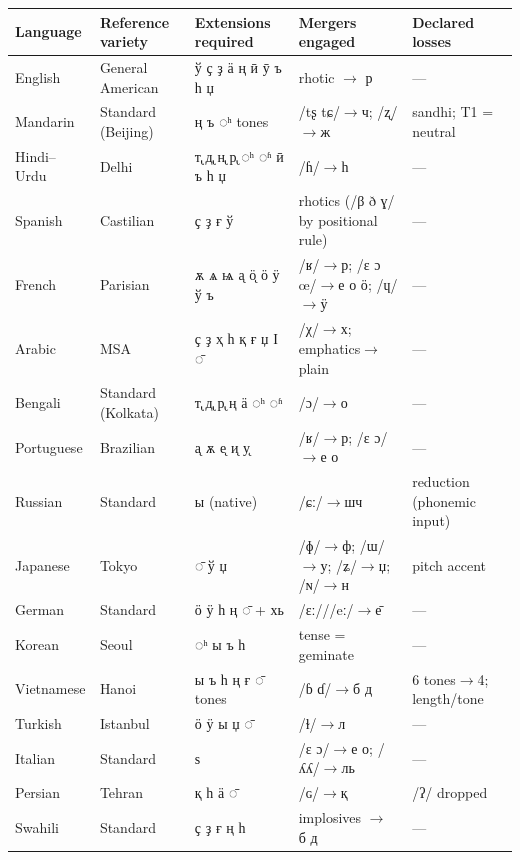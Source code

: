 \documentclass[11pt]{article}
\newcommand{\cz}[1]{{\chu #1}}
\newcommand{\ph}[1]{{\ipafont/#1/}}
\begin{document}
\begin{table}[ht]\centering\footnotesize\setlength{\tabcolsep}{3pt}
\begin{tabular}{lllll}
\toprule
Language & Reference variety & Extensions required & Mergers engaged & Declared losses \\
\midrule
English & General American & \cz{ў ҫ ҙ ӓ ң ӣ ӯ ъ һ џ} & rhotic $\rightarrow$ \cz{р} & — \\
Mandarin & Standard (Beijing) & \cz{ң ъ} \cz{◌ʰ} tones & \ph{tʂ tɕ}$\rightarrow$\cz{ч}; \ph{ʐ}$\rightarrow$\cz{ж} & sandhi; T1 = neutral \\
Hindi--Urdu & Delhi & \cz{т̢ д̢ н̢ р̢} \cz{◌ʰ ◌ʱ} \cz{ӣ ъ һ џ} & \ph{ɦ}$\rightarrow$\cz{һ} & — \\
Spanish & Castilian & \cz{ҫ ҙ ғ ў} & rhotics (\ph{β ð ɣ} by positional rule) & — \\
French & Parisian & \cz{ѫ ѧ ѩ а̨ ӧ̨ ӧ ӱ ў ъ} & \ph{ʁ}$\rightarrow$\cz{р}; \ph{ɛ ɔ œ}$\rightarrow$\cz{е о ӧ}; \ph{ɥ}$\rightarrow$\cz{ӱ} & — \\
Arabic & MSA & \cz{ҫ ҙ ҳ һ қ ғ џ Ӏ ◌̄} & \ph{χ}$\rightarrow$\cz{х}; emphatics$\rightarrow$plain & — \\
Bengali & Standard (Kolkata) & \cz{т̢ д̢ р̢ ң ӓ} \cz{◌ʰ ◌ʱ} & \ph{ɔ}$\rightarrow$\cz{о} & — \\
Portuguese & Brazilian & \cz{а̨ ѫ е̨ и̨ у̨} & \ph{ʁ}$\rightarrow$\cz{р}; \ph{ɛ ɔ}$\rightarrow$\cz{е о} & — \\
Russian & Standard & \cz{ы} (native) & \ph{ɕː}$\rightarrow$\cz{шч} & reduction (phonemic input) \\
Japanese & Tokyo & \cz{◌̄ ў џ} & \ph{ɸ}$\rightarrow$\cz{ф}; \ph{ɯ}$\rightarrow$\cz{у}; \ph{ʑ}$\rightarrow$\cz{џ}; \ph{ɴ}$\rightarrow$\cz{н} & pitch accent \\
German & Standard & \cz{ӧ ӱ һ ң ◌̄} + \cz{хь} & \ph{ɛː}/\ph{eː}$\rightarrow$\cz{е̄} & — \\
Korean & Seoul & \cz{◌ʰ} \cz{ы ъ һ} & tense = geminate & — \\
Vietnamese & Hanoi & \cz{ы ъ һ ң ғ ◌̄} tones & \ph{ɓ ɗ}$\rightarrow$\cz{б д} & 6 tones$\rightarrow$4; length/tone \\
Turkish & Istanbul & \cz{ӧ ӱ ы џ ◌̄} & \ph{ɫ}$\rightarrow$\cz{л} & — \\
Italian & Standard & \cz{ѕ} & \ph{ɛ ɔ}$\rightarrow$\cz{е о}; \ph{ʎʎ}$\rightarrow$\cz{ль} & — \\
Persian & Tehran & \cz{қ һ ӓ ◌̄} & \ph{ɢ}$\rightarrow$\cz{қ} & \ph{ʔ} dropped \\
Swahili & Standard & \cz{ҫ ҙ ғ ң һ} & implosives $\rightarrow$ \cz{б д} & — \\

\end{tabular}
\end{table}
\end{document}
